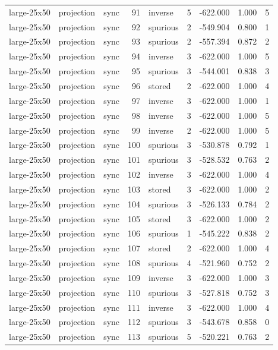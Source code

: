 \begin{tabular}{lllrlrrrr}
large-25x50 & projection & sync & 91 & inverse & 5 & -622.000 & 1.000 & 5 \\
large-25x50 & projection & sync & 92 & spurious & 2 & -549.904 & 0.800 & 1 \\
large-25x50 & projection & sync & 93 & spurious & 2 & -557.394 & 0.872 & 2 \\
large-25x50 & projection & sync & 94 & inverse & 3 & -622.000 & 1.000 & 5 \\
large-25x50 & projection & sync & 95 & spurious & 3 & -544.001 & 0.838 & 3 \\
large-25x50 & projection & sync & 96 & stored & 2 & -622.000 & 1.000 & 4 \\
large-25x50 & projection & sync & 97 & inverse & 3 & -622.000 & 1.000 & 1 \\
large-25x50 & projection & sync & 98 & inverse & 3 & -622.000 & 1.000 & 5 \\
large-25x50 & projection & sync & 99 & inverse & 2 & -622.000 & 1.000 & 5 \\
large-25x50 & projection & sync & 100 & spurious & 3 & -530.878 & 0.792 & 1 \\
large-25x50 & projection & sync & 101 & spurious & 3 & -528.532 & 0.763 & 2 \\
large-25x50 & projection & sync & 102 & inverse & 3 & -622.000 & 1.000 & 4 \\
large-25x50 & projection & sync & 103 & stored & 3 & -622.000 & 1.000 & 2 \\
large-25x50 & projection & sync & 104 & spurious & 3 & -526.133 & 0.784 & 2 \\
large-25x50 & projection & sync & 105 & stored & 3 & -622.000 & 1.000 & 2 \\
large-25x50 & projection & sync & 106 & spurious & 1 & -545.222 & 0.838 & 2 \\
large-25x50 & projection & sync & 107 & stored & 2 & -622.000 & 1.000 & 4 \\
large-25x50 & projection & sync & 108 & spurious & 4 & -521.960 & 0.752 & 2 \\
large-25x50 & projection & sync & 109 & inverse & 3 & -622.000 & 1.000 & 3 \\
large-25x50 & projection & sync & 110 & spurious & 3 & -527.818 & 0.752 & 3 \\
large-25x50 & projection & sync & 111 & inverse & 3 & -622.000 & 1.000 & 4 \\
large-25x50 & projection & sync & 112 & spurious & 3 & -543.678 & 0.858 & 0 \\
large-25x50 & projection & sync & 113 & spurious & 5 & -520.221 & 0.763 & 2 \\

\end{tabular}

